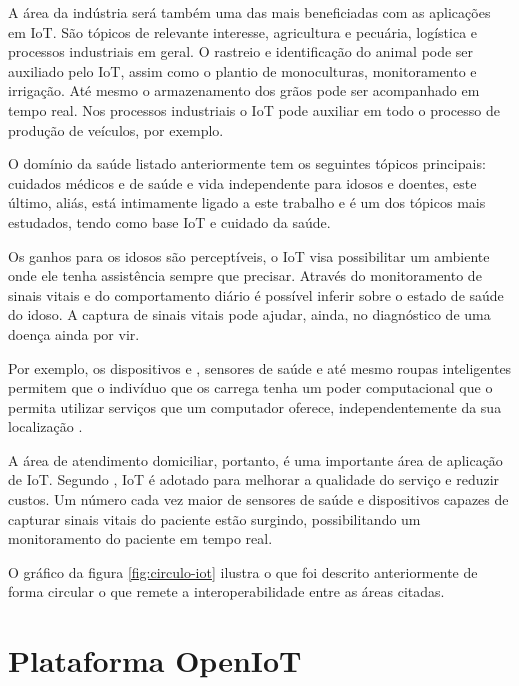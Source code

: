 A área da indústria será também uma das mais beneficiadas com as aplicações em IoT.
São tópicos de relevante interesse, agricultura e pecuária, logística e 
processos industriais em geral. O rastreio e identificação do animal pode ser
auxiliado pelo IoT, assim como o plantio de monoculturas, monitoramento e 
irrigação. Até mesmo o armazenamento dos grãos pode ser acompanhado em tempo
real. Nos processos industriais o IoT pode auxiliar em todo o processo
de produção de veículos, por exemplo. 

O domínio da saúde listado anteriormente tem os seguintes tópicos principais:
cuidados médicos e de saúde e vida independente para idosos e doentes, este último, aliás,
está intimamente ligado a este trabalho e é um dos tópicos mais estudados, tendo
como base IoT e cuidado da saúde.

Os ganhos para os idosos são perceptíveis, o IoT visa possibilitar um ambiente
onde ele tenha assistência sempre que precisar. Através do monitoramento de 
sinais vitais e do comportamento diário é possível inferir sobre o estado 
de saúde do idoso. A captura de sinais vitais pode ajudar, ainda, no diagnóstico
de uma doença ainda por vir.

Por exemplo, os dispositivos \smartphones[] e \smartwatches, sensores de saúde e até 
mesmo roupas inteligentes permitem que o indivíduo que os carrega tenha um poder 
computacional que o permita utilizar serviços que um computador oferece, 
independentemente da sua localização \cite{de2003computaccao}.

A área de atendimento domiciliar, portanto, é uma importante área de aplicação de IoT.
Segundo , IoT é adotado para melhorar a qualidade
do serviço e reduzir custos. Um número cada vez maior de sensores de saúde e
dispositivos capazes de capturar sinais vitais do paciente estão
surgindo, possibilitando um monitoramento do paciente em tempo real.

O gráfico da figura \ref{fig:circulo-iot} ilustra o que foi descrito
anteriormente de forma circular o que remete a interoperabilidade entre as
áreas citadas.


\section{Plataforma OpenIoT}\label{sec:openiot}

